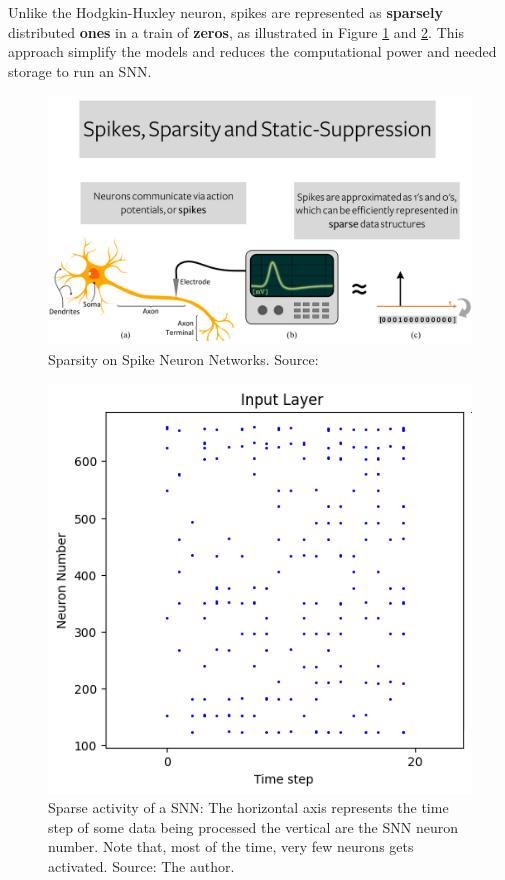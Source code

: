 			\par Unlike the Hodgkin-Huxley neuron, spikes are represented as \textbf{sparsely} distributed \textbf{ones} in a train of \textbf{zeros}, as illustrated in Figure \ref{fig:spikessparsitystaticsupress} and \ref{fig:sparsity}. This approach simplify the models and reduces the computational power and needed storage to run an SNN.\newline
			
				\begin{figure}[H]
					\centering
					\includegraphics[width=\linewidth]{images/spikesSparsityStaticSupress}
					\caption{Sparsity on Spike Neuron Networks. Source: \cite{10242251}}
					\label{fig:spikessparsitystaticsupress}
				\end{figure}

				\begin{figure}[H]
					\centering
					\includegraphics[width=.5\linewidth]{images/sparsity}
					\caption[Sparse activity of a SNN]{Sparse activity of a SNN: The horizontal axis represents the time step of some data being processed the vertical are the SNN neuron number. Note that, most of the time, very few neurons gets activated. Source: The author.}
					\label{fig:sparsity}
				\end{figure}
			

